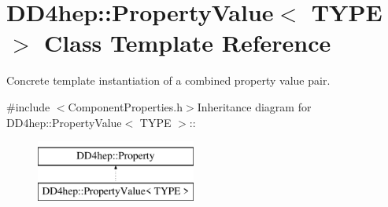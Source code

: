 \hypertarget{class_d_d4hep_1_1_property_value}{
\section{DD4hep::PropertyValue$<$ TYPE $>$ Class Template Reference}
\label{class_d_d4hep_1_1_property_value}
}


Concrete template instantiation of a combined property value pair.  


{\ttfamily \#include $<$ComponentProperties.h$>$}Inheritance diagram for DD4hep::PropertyValue$<$ TYPE $>$::\begin{figure}[H]
\begin{center}
\leavevmode
\includegraphics[height=2cm]{class_d_d4hep_1_1_property_value}
\end{center}
\end{figure}
